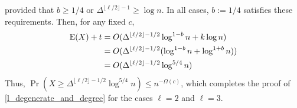 \documentclass{patmorin}
\begin{document}
provided that $b\ge 1/4$ or $\Delta^{\lfloor\ell/2\rfloor-1}\ge\log n$.
In all cases, $b:=1/4$ satisfies these requirements. Then, for any fixed $c$,
\begin{align*}
  \mathrm{E}(X)+t
    & = O(\Delta^{\lfloor\ell/2\rfloor-1/2}\log^{1-b} n + k\log n) \\
    & = O(\Delta^{\lfloor\ell/2\rfloor-1/2}(\log^{1-b} n + \log^{1+b} n)) \\
    & = O(\Delta^{\lfloor\ell/2\rfloor-1/2}\log^{5/4} n)
\end{align*}
Thus, $\Pr(X\ge \Delta^{\lfloor\ell/2\rfloor-1/2}\log^{5/4} n) \le n^{-\Omega(c)}$, which completes the proof of \cref{l_degenerate_and_degree} for the cases $\ell=2$ and $\ell=3$.



\end{document}
